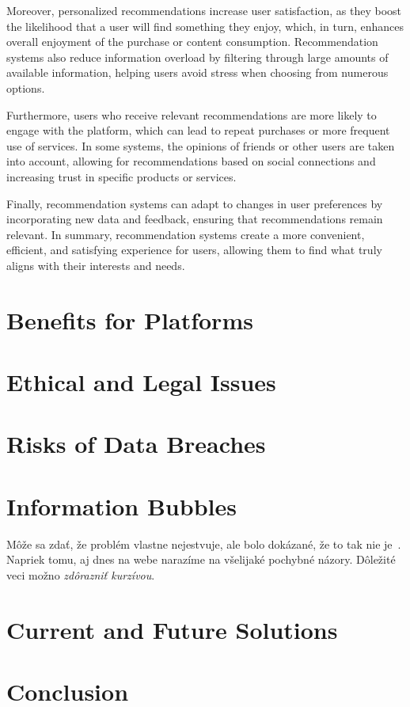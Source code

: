\documentclass[10pt,twoside,slovak,a4paper]{article}
\begin{document}
Moreover, personalized recommendations increase user satisfaction, as they boost the likelihood that a user will find something they enjoy, which, in turn, enhances overall enjoyment of the purchase or content consumption. Recommendation systems also reduce information overload by filtering through large amounts of available information, helping users avoid stress when choosing from numerous options.

Furthermore, users who receive relevant recommendations are more likely to engage with the platform, which can lead to repeat purchases or more frequent use of services. In some systems, the opinions of friends or other users are taken into account, allowing for recommendations based on social connections and increasing trust in specific products or services.

Finally, recommendation systems can adapt to changes in user preferences by incorporating new data and feedback, ensuring that recommendations remain relevant. In summary, recommendation systems create a more convenient, efficient, and satisfying experience for users, allowing them to find what truly aligns with their interests and needs.

\section{Benefits for Platforms} \label{Benefits for Platforms}

\section{Ethical and Legal Issues} \label{Ethical and Legal Issues}

\section{Risks of Data Breaches} \label{Risks of Data Breaches}

\section{Information Bubbles} \label{Information Bubbles}



Môže sa zdať, že problém vlastne nejestvuje\cite{Coplien:MPD}, ale bolo dokázané, že to tak nie je~\cite{Czarnecki:Staged, Czarnecki:Progress}. Napriek tomu, aj dnes na webe narazíme na všelijaké pochybné názory\cite{PLP-Framework}. Dôležité veci možno \emph{zdôrazniť kurzívou}.

\section{Current and Future Solutions} \label{Current and Future Solutions}

\section{Conclusion} \label{Conclusion}





\end{document}
